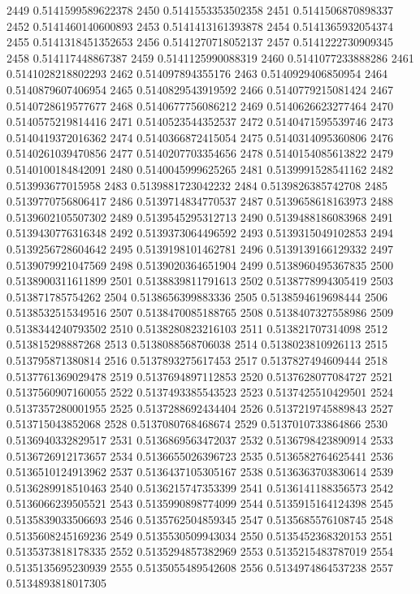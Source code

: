 2449 0.5141599589622378
2450 0.5141553353502358
2451 0.5141506870898337
2452 0.5141460140600893
2453 0.5141413161393878
2454 0.5141365932054374
2455 0.5141318451352653
2456 0.5141270718052137
2457 0.5141222730909345
2458 0.514117448867387
2459 0.5141125990088319
2460 0.5141077233888286
2461 0.5141028218802293
2462 0.514097894355176
2463 0.5140929406850954
2464 0.5140879607406954
2465 0.5140829543919592
2466 0.5140779215081424
2467 0.5140728619577677
2468 0.5140677756086212
2469 0.5140626623277464
2470 0.5140575219814416
2471 0.5140523544352537
2472 0.5140471595539746
2473 0.5140419372016362
2474 0.5140366872415054
2475 0.5140314095360806
2476 0.5140261039470856
2477 0.5140207703354656
2478 0.5140154085613822
2479 0.5140100184842091
2480 0.5140045999625265
2481 0.5139991528541162
2482 0.513993677015958
2483 0.5139881723042232
2484 0.5139826385742708
2485 0.5139770756806417
2486 0.5139714834770537
2487 0.5139658618163973
2488 0.5139602105507302
2489 0.5139545295312713
2490 0.5139488186083968
2491 0.5139430776316348
2492 0.5139373064496592
2493 0.5139315049102853
2494 0.5139256728604642
2495 0.5139198101462781
2496 0.5139139166129332
2497 0.5139079921047569
2498 0.5139020364651904
2499 0.5138960495367835
2500 0.5138900311611899
2501 0.5138839811791613
2502 0.5138778994305419
2503 0.513871785754262
2504 0.5138656399883336
2505 0.5138594619698444
2506 0.5138532515349516
2507 0.5138470085188765
2508 0.5138407327558986
2509 0.5138344240793502
2510 0.5138280823216103
2511 0.513821707314098
2512 0.513815298887268
2513 0.5138088568706038
2514 0.5138023810926113
2515 0.513795871380814
2516 0.5137893275617453
2517 0.5137827494609444
2518 0.5137761369029478
2519 0.5137694897112853
2520 0.5137628077084727
2521 0.5137560907160055
2522 0.5137493385543523
2523 0.5137425510429501
2524 0.5137357280001955
2525 0.5137288692434404
2526 0.5137219745889843
2527 0.513715043852068
2528 0.5137080768468674
2529 0.5137010733864866
2530 0.5136940332829517
2531 0.5136869563472037
2532 0.5136798423890914
2533 0.5136726912173657
2534 0.5136655026396723
2535 0.5136582764625441
2536 0.5136510124913962
2537 0.5136437105305167
2538 0.5136363703830614
2539 0.5136289918510463
2540 0.5136215747353399
2541 0.5136141188356573
2542 0.5136066239505521
2543 0.5135990898774099
2544 0.5135915164124398
2545 0.5135839033506693
2546 0.5135762504859345
2547 0.5135685576108745
2548 0.5135608245169236
2549 0.5135530509943034
2550 0.5135452368320153
2551 0.5135373818178335
2552 0.5135294857382969
2553 0.5135215483787019
2554 0.5135135695230939
2555 0.5135055489542608
2556 0.5134974864537238
2557 0.5134893818017305
